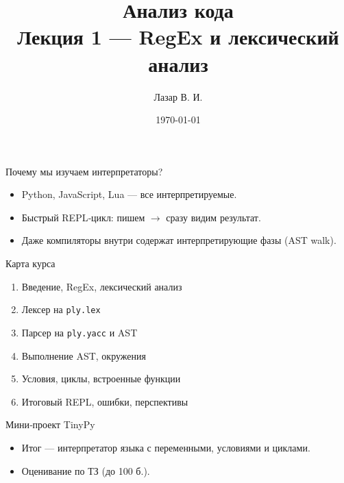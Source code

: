 \documentclass[aspectratio=169]{beamer}
\title[Лекция 1]{Анализ кода\\ \small Лекция 1 — RegEx и лексический анализ}
\author{Лазар В. И.}
\institute[10 класс]{Школьный курс программирования}
\date{\today}
\begin{document}
\begin{frame}
	\titlepage
\end{frame}
\begin{frame}{Почему мы изучаем интерпретаторы?}
	\begin{itemize}
		\item Python, JavaScript, Lua — все интерпретируемые.
		\item Быстрый REPL‑цикл: пишем $\rightarrow$ сразу видим результат.
		\item Даже компиляторы внутри содержат интерпретирующие фазы (AST walk).
	\end{itemize}
	\pause
\end{frame}

\begin{frame}{Карта курса}
	\begin{enumerate}
		\item Введение, RegEx, лексический анализ
		\item Лексер на \texttt{ply.lex}
		\item Парсер на \texttt{ply.yacc} и AST
		\item Выполнение AST, окружения
		\item Условия, циклы, встроенные функции
		\item Итоговый REPL, ошибки, перспективы
	\end{enumerate}
\end{frame}

\begin{frame}{Мини‑проект TinyPy}
	\begin{itemize}
		\item Итог — интерпретатор языка с переменными, условиями и циклами.
		\item Оценивание по ТЗ (до 100 б.).
	\end{itemize}
\end{frame}
\end{document}
